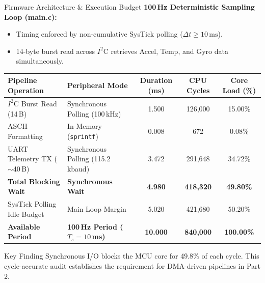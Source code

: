 \documentclass[aspectratio=169, 10pt]{beamer}
\begin{document}
\begin{frame}{Firmware Architecture \& Execution Budget}
    \textbf{100\,Hz Deterministic Sampling Loop (main.c):}
    \begin{itemize}
        \item Timing enforced by non-cumulative SysTick polling ($\Delta t \ge 10\,\text{ms}$).
        \item 14-byte burst read across $I^2\text{C}$ retrieves Accel, Temp, and Gyro data simultaneously.
    \end{itemize}
    \vspace{0.1cm}
    \begin{table}[h]
        \centering
        \scriptsize
        \begin{tabular}{llccc}
            \toprule
            \textbf{Pipeline Operation} & \textbf{Peripheral Mode} & \textbf{Duration (ms)} & \textbf{CPU Cycles} & \textbf{Core Load (\%)} \\
            \midrule
            $I^2\text{C}$ Burst Read (14\,B) & Synchronous Polling (100\,kHz) & 1.500 & 126,000 & 15.00\% \\
            ASCII Formatting & In-Memory (\texttt{sprintf}) & 0.008 & 672 & 0.08\% \\
            UART Telemetry TX ($\sim$40\,B) & Synchronous Polling (115.2\,kbaud) & 3.472 & 291,648 & 34.72\% \\
            \midrule
            \textbf{Total Blocking Wait} & \textbf{Synchronous Wait} & \textbf{4.980} & \textbf{418,320} & \textbf{49.80\%} \\
            SysTick Polling Idle Budget & Main Loop Margin & 5.020 & 421,680 & 50.20\% \\
            \midrule
            \textbf{Available Period} & \textbf{100\,Hz Period ($T_s = 10$\,ms)} & \textbf{10.000} & \textbf{840,000} & \textbf{100.00\%} \\
            \bottomrule
        \end{tabular}
    \end{table}
    \vspace{0.1cm}
    \begin{alertblock}{Key Finding}
        Synchronous I/O blocks the MCU core for 49.8\% of each cycle. This cycle-accurate audit establishes the requirement for DMA-driven pipelines in Part 2.
    \end{alertblock}
\end{frame}
\end{document}
